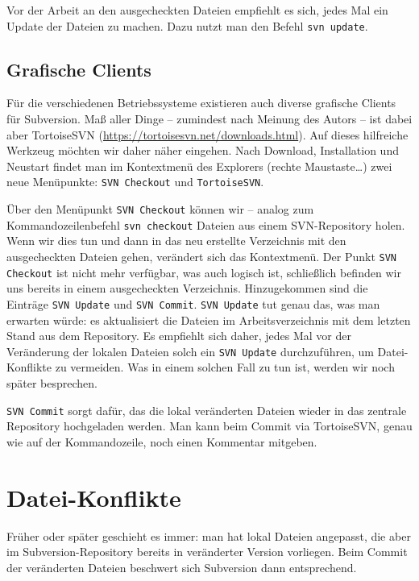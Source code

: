 Vor der Arbeit an den ausgecheckten Dateien empfiehlt es sich, jedes Mal ein Update der Dateien zu machen. Dazu nutzt man den Befehl \texttt{svn update}.  

\subsection{Grafische Clients}

Für die verschiedenen Betriebssysteme existieren auch diverse grafische Clients für Subversion.
Maß aller Dinge -- zumindest nach Meinung des Autors -- ist dabei aber TortoiseSVN (\url{https://tortoisesvn.net/downloads.html}). 
Auf dieses hilfreiche Werkzeug möchten wir daher näher eingehen. 
Nach Download, Installation und Neustart findet man im Kontextmenü des Explorers (rechte Maustaste\ldots)  zwei neue Menüpunkte: \texttt{SVN Checkout} und \texttt{TortoiseSVN}.

Über den Menüpunkt \texttt{SVN Checkout} können wir -- analog zum Kommandozeilenbefehl \texttt{svn checkout} Dateien aus einem SVN-Repository holen.
Wenn wir dies tun und dann in das neu erstellte Verzeichnis mit den ausgecheckten Dateien gehen, verändert sich das Kontextmenü. Der Punkt \texttt{SVN Checkout} ist nicht mehr verfügbar, was auch logisch ist, schließlich befinden wir uns bereits in einem ausgecheckten Verzeichnis. Hinzugekommen sind die Einträge \texttt{SVN Update} und \texttt{SVN Commit}. \texttt{SVN Update} tut genau das, was man erwarten würde: es aktualisiert die Dateien im Arbeitsverzeichnis mit dem letzten Stand aus dem Repository. Es empfiehlt sich daher, jedes Mal vor der Veränderung der lokalen Dateien solch ein \texttt{SVN Update} durchzuführen, um Datei-Konflikte zu vermeiden. Was in einem solchen Fall zu tun ist, werden wir noch später besprechen.

\texttt{SVN Commit} sorgt dafür, das die lokal veränderten Dateien wieder in das zentrale Repository hochgeladen werden. Man kann beim Commit via TortoiseSVN, genau wie auf der Kommandozeile, noch einen Kommentar mitgeben.

\section{Datei-Konflikte}

Früher oder später geschieht es immer: man hat lokal Dateien angepasst, die aber im Subversion-Repository bereits in veränderter Version vorliegen. Beim Commit der veränderten Dateien beschwert sich Subversion dann entsprechend.

